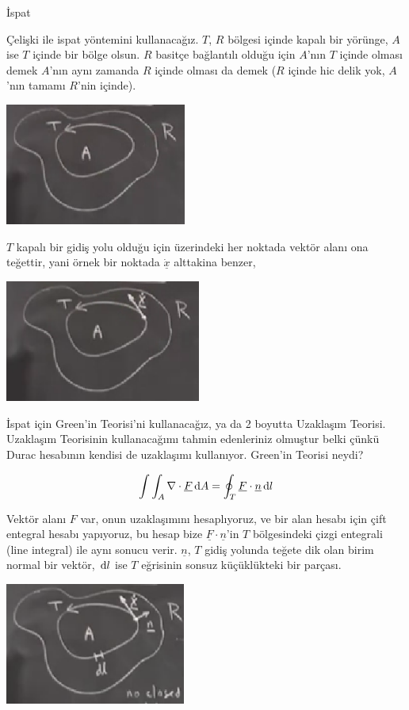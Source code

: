 \documentclass[12pt,fleqn]{article}\usepackage{../../common}
\begin{document}
İspat

Çelişki ile ispat yöntemini kullanacağız. $T$, $R$ bölgesi içinde kapalı bir
yörünge, $A$ ise $T$ içinde bir bölge olsun. $R$ basitçe bağlantılı olduğu için
$A$'nın $T$ içinde olması demek $A$'nın aynı zamanda $R$ içinde olması da
demek ($R$ içinde hic delik yok, $A$'nın tamamı $R$'nin içinde).

\includegraphics[height=4cm]{09_04.png}

$T$ kapalı bir gidiş yolu olduğu için üzerindeki her noktada vektör alanı ona
teğettir, yani örnek bir noktada $\dot{\underline{x}}$ alttakina benzer,

\includegraphics[height=4cm]{09_05.png}

İspat için Green'in Teorisi'ni kullanacağız, ya da 2 boyutta Uzaklaşım
Teorisi. Uzaklaşım Teorisinin kullanacağımı tahmin edenleriniz olmuştur belki
çünkü Durac hesabının kendisi de uzaklaşımı kullanıyor. Green'in Teorisi neydi?

$$
\int \int_{A} \nabla \cdot \underline{F} \,\mathrm{d} A =
\oint_T \underline{F} \cdot \underline{n} \,\mathrm{d} l
$$

Vektör alanı $F$ var, onun uzaklaşımını hesaplıyoruz, ve bir alan hesabı için
çift entegral hesabı yapıyoruz, bu hesap bize $\underline{F} \cdot
\underline{n}$'in $T$ bölgesindeki çizgi entegrali (line integral) ile aynı
sonucu verir. $\underline{n}$, $T$ gidiş yolunda teğete dik olan birim normal bir
vektör, $\,\mathrm{d} l$ ise $T$ eğrisinin sonsuz küçüklükteki bir parçası. 

\includegraphics[height=4cm]{09_06.png}
\end{document}
